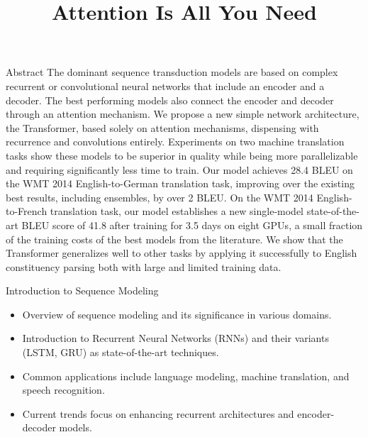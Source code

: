 \documentclass{beamer}
\title{Attention Is All You Need}
\author{}
\begin{document}
\frame{\titlepage}
\begin{frame}{Abstract}
The dominant sequence transduction models are based on complex recurrent or convolutional neural networks that include an encoder and a decoder. The best performing models also connect the encoder and decoder through an attention mechanism. We propose a new simple network architecture, the Transformer, based solely on attention mechanisms, dispensing with recurrence and convolutions entirely. Experiments on two machine translation tasks show these models to be superior in quality while being more parallelizable and requiring significantly less time to train. Our model achieves 28.4 BLEU on the WMT 2014 English-to-German translation task, improving over the existing best results, including ensembles, by over 2 BLEU. On the WMT 2014 English-to-French translation task, our model establishes a new single-model state-of-the-art BLEU score of 41.8 after training for 3.5 days on eight GPUs, a small fraction of the training costs of the best models from the literature. We show that the Transformer generalizes well to other tasks by applying it successfully to English constituency parsing both with large and limited training data. %
\end{frame}

\begin{frame}{Introduction to Sequence Modeling}
\begin{itemize}
\item Overview of sequence modeling and its significance in various domains.
\item Introduction to Recurrent Neural Networks (RNNs) and their variants (LSTM, GRU) as state-of-the-art techniques.
\item Common applications include language modeling, machine translation, and speech recognition.
\item Current trends focus on enhancing recurrent architectures and encoder-decoder models.
\end{itemize}
\end{frame}
\end{document}
